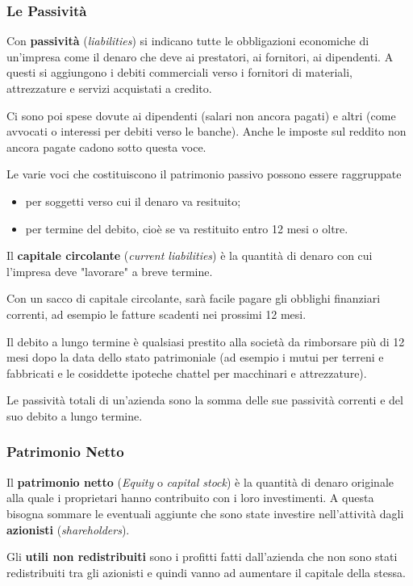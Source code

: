 \documentclass[a4paper,portrait,12pt]{article}
\theoremstyle{definition}
\begin{document}
\subsubsection{Le Passività}
Con \textbf{passività} (\emph{liabilities}) si indicano tutte le obbligazioni economiche di un'impresa come il denaro che deve ai prestatori, ai fornitori, ai dipendenti.
A questi si aggiungono i debiti commerciali verso i fornitori di materiali, attrezzature e servizi acquistati a credito.

Ci sono poi spese dovute ai dipendenti (salari non ancora pagati) e altri (come avvocati o interessi per debiti verso le banche).
Anche le imposte sul reddito non ancora pagate cadono sotto questa voce.

Le varie voci che costituiscono il patrimonio passivo possono essere raggruppate
\begin{itemize}
\item per soggetti verso cui il denaro va resituito;
\item per termine del debito, cioè se va restituito entro 12 mesi o oltre.
\end{itemize}

Il \textbf{capitale circolante} (\emph{current liabilities}) è la quantità di denaro con cui l'impresa deve "lavorare" a breve termine.

Con un sacco di capitale circolante, sarà facile pagare gli obblighi finanziari correnti, ad esempio le fatture scadenti nei prossimi 12 mesi.

Il debito a lungo termine è qualsiasi prestito alla società da rimborsare più di 12 mesi dopo la data dello stato patrimoniale (ad esempio i mutui per terreni e fabbricati e le cosiddette ipoteche chattel per macchinari e attrezzature).

Le passività totali di un'azienda sono la somma delle sue passività correnti e del suo debito a lungo termine.

\subsubsection{Patrimonio Netto}

Il \textbf{patrimonio netto} (\emph{Equity} o \emph{capital stock}) è la quantità di denaro originale alla quale i proprietari hanno contribuito con i loro investimenti. A questa bisogna sommare le eventuali aggiunte che sono state investire nell'attività dagli \textbf{azionisti} (\emph{shareholders}).

Gli \textbf{utili non redistribuiti} sono i profitti fatti dall'azienda che non sono stati redistribuiti tra gli azionisti e quindi vanno ad aumentare il capitale della stessa.
\end{document}
